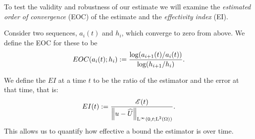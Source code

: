 \documentclass[final]{amsart}
\numberwithin{equation}{section}
\begin{document}
\begin{Defn}
  To test the validity and robustness of our estimate we will
  examine the \emph{estimated order of convergence} (EOC) of the
  estimate and the \emph{effectivity index} (EI).
	
  Consider two sequences, $a_i(t)$ and $h_i$, which converge to zero
  from above.  We define the EOC for these to be
  \begin{equation}\label{eq_EOC}
    EOC\!\left({a_i(t);h_i}\right):=\frac{\log\!\left({a_{i+1}(t)/a_{i}(t)}\right)}{\log\!\left({h_{i+1}/h_{i}}\right)}.
  \end{equation}
	
  We define the $EI$ at a time $t$ to be the ratio of the estimator
  and the error at that time, that is:
  \begin{equation}
    EI\!\left({t}\right):=\frac{\mathscr E(t)}{\left\|u - \widehat U\right\|_{\operatorname L^{\infty}(0,t;\operatorname L^{2}(\Omega))}}.
  \end{equation}
  This allows us to quantify how effective a bound the estimator is
  over time.
\end{Defn}
\end{document}
